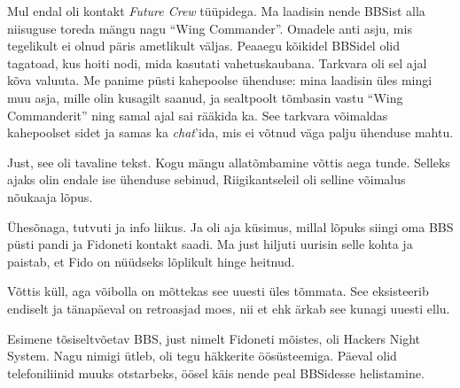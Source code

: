 Mul endal oli kontakt \emph{Future Crew} tüüpidega. Ma laadisin nende BBSist alla niisuguse 
toreda mängu nagu \enquote{Wing Commander}. 
Omadele anti asju, mis tegelikult ei olnud
päris ametlikult väljas. Peaaegu kõikidel BBSidel olid tagatoad, 
kus hoiti nodi, mida kasutati vahetuskaubana. Tarkvara oli sel 
ajal kõva valuuta. Me panime püsti kahepoolse ühenduse: mina 
laadisin üles mingi muu asja, mille olin kusagilt saanud, ja 
sealtpoolt tõmbasin vastu \enquote{Wing Commanderit} ning samal ajal sai rääkida ka. 
See tarkvara võimaldas kahepoolset sidet ja samas ka 
\emph{chat}'ida, mis ei võtnud väga palju ühenduse mahtu.


Just, see oli tavaline tekst. Kogu mängu allatõmbamine võttis 
aega tunde. Selleks ajaks olin endale ise ühenduse sebinud, Riigikantseleil oli
selline võimalus nõukaaja lõpus. 

Ühesõnaga, tutvuti ja info liikus. Ja oli aja küsimus, millal lõpuks siingi 
oma BBS püsti pandi ja Fidoneti kontakt saadi. Ma just hiljuti uurisin selle 
kohta ja paistab, et Fido on nüüdseks lõplikult hinge heitnud.


Võttis küll, aga võibolla on mõttekas see uuesti üles tõmmata. See eksisteerib endiselt ja 
tänapäeval on retroasjad moes, nii et ehk ärkab see kunagi uuesti ellu.


Esimene tõsiseltvõetav BBS, just nimelt Fidoneti mõistes, oli Hackers Night 
System. Nagu 
nimigi ütleb, oli tegu häkkerite öösüsteemiga. Päeval olid telefoniliinid muuks 
otstarbeks, öösel käis nende peal BBSidesse helistamine. 


